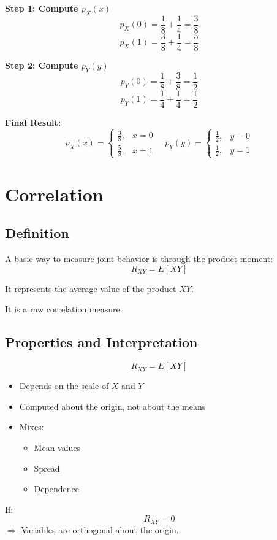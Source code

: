 \documentclass[12pt]{article}
\begin{document}
\textbf{Step 1: Compute $p_X(x)$}
\[
p_X(0) = \frac{1}{8} + \frac{1}{4} = \frac{3}{8}
\]
\[
p_X(1) = \frac{3}{8} + \frac{1}{4} = \frac{5}{8}
\]

\textbf{Step 2: Compute $p_Y(y)$}
\[
p_Y(0) = \frac{1}{8} + \frac{3}{8} = \frac{1}{2}
\]
\[
p_Y(1) = \frac{1}{4} + \frac{1}{4} = \frac{1}{2}
\]

\textbf{Final Result:}
\[
p_X(x) =
\begin{cases}
\frac{3}{8}, & x=0 \\
\frac{5}{8}, & x=1
\end{cases}
\quad
p_Y(y) =
\begin{cases}
\frac{1}{2}, & y=0 \\
\frac{1}{2}, & y=1
\end{cases}
\]

\section{Correlation}

\subsection{Definition}

A basic way to measure joint behavior is through the product moment:
\[
R_{XY} = E[XY]
\]

It represents the average value of the product $XY$.

It is a raw correlation measure.

\subsection{Properties and Interpretation}

\[
R_{XY} = E[XY]
\]

\begin{itemize}
\item Depends on the scale of $X$ and $Y$
\item Computed about the origin, not about the means
\item Mixes:
\begin{itemize}
\item Mean values
\item Spread
\item Dependence
\end{itemize}
\end{itemize}

If:
\[
R_{XY} = 0
\]
$\Rightarrow$ Variables are orthogonal about the origin.
\end{document}
